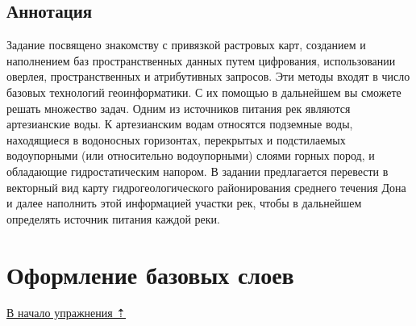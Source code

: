 \documentclass[]{book}
\theoremstyle{definition}
\theoremstyle{definition}
\theoremstyle{definition}
\theoremstyle{remark}
\begin{document}
\hypertarget{map-ref-hydrogeologic-annotation}{%
\subsection{Аннотация}\label{map-ref-hydrogeologic-annotation}}

Задание посвящено знакомству с привязкой растровых карт, созданием и
наполнением баз пространственных данных путем цифрования, использовании
оверлея, пространственных и атрибутивных запросов. Эти методы входят в
число базовых технологий геоинформатики. С их помощью в дальнейшем вы
сможете решать множество задач. Одним из источников питания рек являются
артезианские воды. К артезианским водам относятся подземные воды,
находящиеся в водоносных горизонтах, перекрытых и подстилаемых
водоупорными (или относительно водоупорными) слоями горных пород, и
обладающие гидростатическим напором. В задании предлагается перевести в
векторный вид карту гидрогеологического районирования среднего течения
Дона и далее наполнить этой информацией участки рек, чтобы в дальнейшем
определять источник питания каждой реки.

\hypertarget{map-ref-hydrogeologic-base}{%
\section{Оформление базовых слоев}\label{map-ref-hydrogeologic-base}}

\protect\hyperlink{map-ref-hydrogeologic}{В начало упражнения ⇡}
\end{document}
